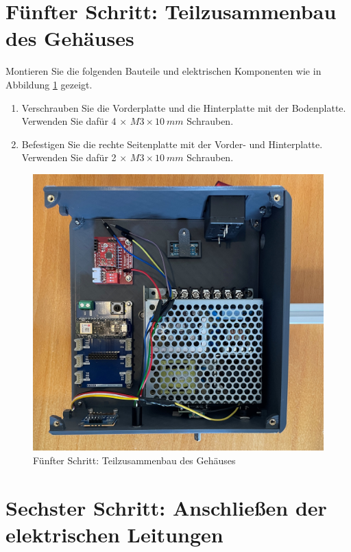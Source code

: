 \section{Fünfter Schritt: Teilzusammenbau des Gehäuses}
Montieren Sie die folgenden Bauteile und elektrischen Komponenten wie in Abbildung \ref{5.S} gezeigt. 

\begin{enumerate}
	\item Verschrauben Sie die Vorderplatte und die Hinterplatte mit der Bodenplatte. Verwenden Sie dafür 4 $\times$ $ M3 \times 10 \ mm $ Schrauben.
	\item Befestigen Sie die rechte Seitenplatte mit der Vorder- und Hinterplatte. Verwenden Sie dafür 2 $\times$ $ M3 \times 10 \ mm $ Schrauben.
\end{enumerate}

\begin{figure}[H]
	\begin{center}
		\includegraphics[width=\textwidth]{Images/5Schr.jpg}
		\caption{Fünfter Schritt: Teilzusammenbau des Gehäuses} \label{5.S}
	\end{center}
\end{figure}


\section{Sechster Schritt: Anschließen der elektrischen Leitungen}


